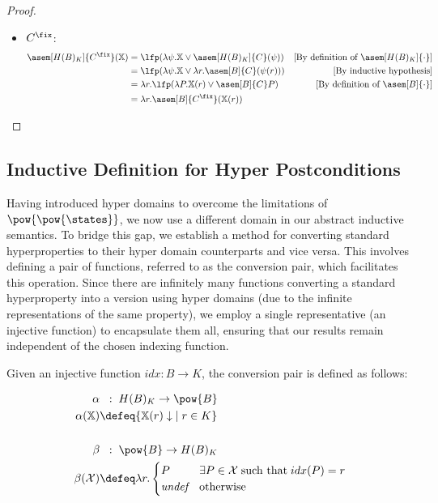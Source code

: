 \begin{proof}
\begin{itemize}
    \item $C^\fix$:
      \begin{align*}
        \asem[H(B)_K]{C^\fix}(\chi)
          &= \lfp(\lambda \psi . \chi \lor \asem[H(B)_K]{C}(\psi))
          &\text{[By definition of $\asem[H(B)_K]{\cdot}$]} \\
          &= \lfp(\lambda \psi . \chi \lor \lambda r . \asem[B]{C}(\psi(r)))
          &\text{[By inductive hypothesis]} \\
          &= \lambda r . \lfp(\lambda P . \chi(r) \lor \asem[B]{C} P)
          &\text{[By definition of $\asem[B]{\cdot}$]} \\
          &= \lambda r . \asem[B]{C^\fix}(\chi(r))
      \end{align*}
  \end{itemize}
\end{proof}


\subsection{Inductive Definition for Hyper Postconditions}

Having introduced hyper domains to overcome the limitations of
$\pow{\pow{\states}}$, we now use a different domain in our abstract inductive
semantics. To bridge this gap, we establish a method for converting standard
hyperproperties to their hyper domain counterparts and vice versa. This
involves defining a pair of functions, referred to as the conversion pair,
which facilitates this operation. Since there are infinitely many functions
converting a standard hyperproperty into a version using hyper domains (due to
the infinite representations of the same property), we employ a single
representative (an injective function) to encapsulate them all, ensuring that
our results remain independent of the chosen indexing function.

\begin{definition}
  Given an injective function $idx : B \to K$, the conversion pair is defined
  as follows:

  \begin{align*}
    \alpha &\;\;:\; H(B)_K \to \pow{B} \\
    \alpha(\chi) &\defeq \{ \chi(r) \downarrow \; \mid r \in K \} \\
    \\
    \beta &\;\;:\; \pow{B} \to H(B)_K \\
    \beta(\mathcal{X}) &\defeq \lambda r . \begin{cases}
      P              & \exists P \in \mathcal{X} \; \text{such that} \; idx(P) = r \\
      \textit{undef} & \text{otherwise}
    \end{cases}
  \end{align*}
\end{definition}

